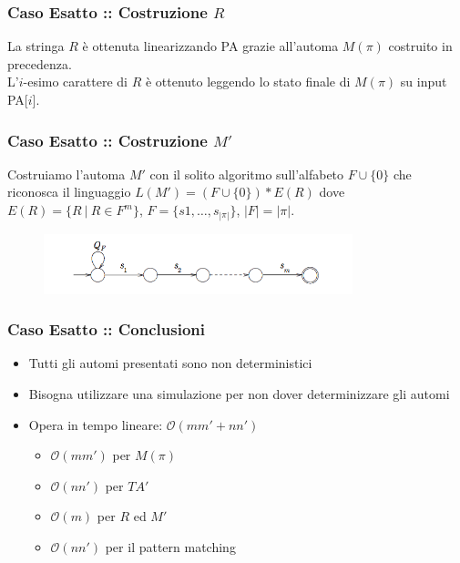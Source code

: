 \documentclass{beamer}
\newcommand{\bigO}{\ensuremath{\mathcal{O}}} %
\begin{document}
\begin{frame}
\frametitle{Caso Esatto :: Costruzione $R$}
La stringa $R$ è ottenuta linearizzando PA grazie all'automa $M(\pi)$ costruito in precedenza.\\
L'$i$-esimo carattere di $R$ è ottenuto leggendo lo stato finale di $M(\pi)$ su input PA[$i$]. \\


\end{frame}

\begin{frame}
\frametitle{Caso Esatto :: Costruzione $M'$}
Costruiamo l'automa $M'$ con il solito algoritmo sull'alfabeto $F \cup \{0\}$ che riconosca il linguaggio $L(M') = (F \cup \{0\}) * E(R)$ dove $E(R) =  \{R\ |\ R \in F^m\} $, $F = \{s1,\dots,s_{|\pi|}\}$, $|F| = |\pi|$.
\begin{figure}[p]
    \includegraphics[width=0.8\textwidth]{exact2D_m1.png}
\end{figure}

\end{frame}

\begin{frame}
\frametitle{Caso Esatto :: Conclusioni}
\begin{itemize}
\item Tutti gli automi presentati sono non deterministici
\item Bisogna utilizzare una simulazione per non dover determinizzare gli automi
\item Opera in tempo lineare: $\bigO{(mm'+nn')}$
	\begin{itemize}
	\item $\bigO{(mm')}$ per $M(\pi)$
	\item $\bigO{(nn')}$ per $TA'$
	\item $\bigO{(m)}$ per $R$ ed $M'$
	\item $\bigO{(nn')}$ per il pattern matching
	\end{itemize}
\end{itemize}
\end{frame}
\end{document}
